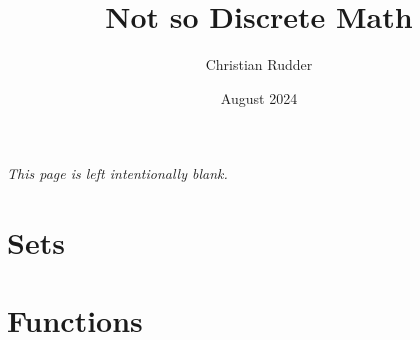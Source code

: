\documentclass{article}
\title{Not so Discrete Math}
\author{Christian Rudder}
\date{August 2024}
\begin{document}
\maketitle

\tableofcontents

\newpage
\thispagestyle{empty}
\mbox{}
\vfill
\begin{center}
    \textit{This page is left intentionally blank.}
\end{center}
\vfill
\newpage

\section{Sets}




\vspace{1em}

\newpage
\section{Functions}

\end{document}

